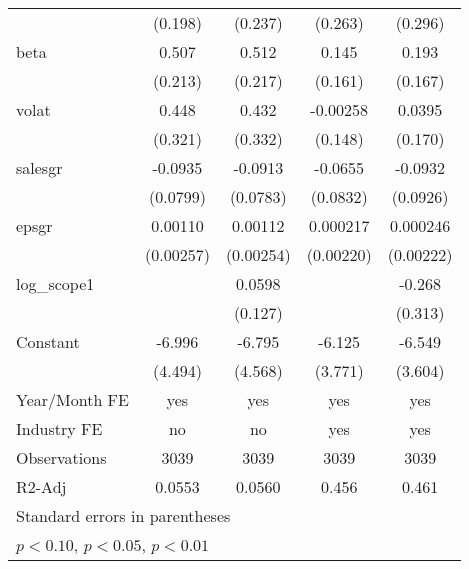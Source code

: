 \begin{table}[htbp]
\begin{tabular}{l*{4}{c}}
                    &     (0.198)         &     (0.237)         &     (0.263)         &     (0.296)         \\
[1em]
beta                &       0.507\sym{**} &       0.512\sym{**} &       0.145         &       0.193         \\
                    &     (0.213)         &     (0.217)         &     (0.161)         &     (0.167)         \\
[1em]
volat               &       0.448         &       0.432         &    -0.00258         &      0.0395         \\
                    &     (0.321)         &     (0.332)         &     (0.148)         &     (0.170)         \\
[1em]
salesgr             &     -0.0935         &     -0.0913         &     -0.0655         &     -0.0932         \\
                    &    (0.0799)         &    (0.0783)         &    (0.0832)         &    (0.0926)         \\
[1em]
epsgr               &     0.00110         &     0.00112         &    0.000217         &    0.000246         \\
                    &   (0.00257)         &   (0.00254)         &   (0.00220)         &   (0.00222)         \\
[1em]
log\_scope1          &                     &      0.0598         &                     &      -0.268         \\
                    &                     &     (0.127)         &                     &     (0.313)         \\
[1em]
Constant            &      -6.996         &      -6.795         &      -6.125         &      -6.549\sym{*}  \\
                    &     (4.494)         &     (4.568)         &     (3.771)         &     (3.604)         \\
\hline
Year/Month FE       &         yes         &         yes         &         yes         &         yes         \\
Industry FE         &          no         &          no         &         yes         &         yes         \\
Observations        &        3039         &        3039         &        3039         &        3039         \\
R2-Adj              &      0.0553         &      0.0560         &       0.456         &       0.461         \\
\hline\hline
\multicolumn{5}{l}{\footnotesize Standard errors in parentheses}\\
\multicolumn{5}{l}{\footnotesize \sym{*} \(p<0.10\), \sym{**} \(p<0.05\), \sym{***} \(p<0.01\)}\\
\end{tabular}
\end{table}

